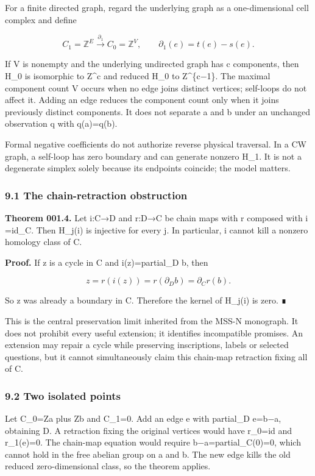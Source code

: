 \documentclass[
  11pt,
]{article}
\begin{document}
For a finite directed graph, regard the underlying graph as a
one-dimensional cell complex and define

\[
C_1=\mathbb Z^E\xrightarrow{\partial_1}C_0=\mathbb Z^V,
\qquad\partial_1(e)=t(e)-s(e).
\]

If V is nonempty and the underlying undirected graph has c components,
then H\_0 is isomorphic to Z\^{}c and reduced H\_0 to Z\^{}\{c−1\}. The
maximal component count \textbar V\textbar{} occurs when no edge joins
distinct vertices; self-loops do not affect it. Adding an edge reduces
the component count only when it joins previously distinct components.
It does not separate a and b under an unchanged observation q with
q(a)=q(b).

Formal negative coefficients do not authorize reverse physical
traversal. In a CW graph, a self-loop has zero boundary and can generate
nonzero H\_1. It is not a degenerate simplex solely because its
endpoints coincide; the model matters.

\subsubsection{9.1 The chain-retraction
obstruction}\label{the-chain-retraction-obstruction}

\textbf{Theorem 001.4.} Let i:C→D and r:D→C be chain maps with r
composed with i =id\_C. Then H\_j(i) is injective for every j. In
particular, i cannot kill a nonzero homology class of C.

\textbf{Proof.} If z is a cycle in C and i(z)=partial\_D b, then

\[
z=r(i(z))=r(\partial_D b)=\partial_C r(b).
\]

So z was already a boundary in C. Therefore the kernel of H\_j(i) is
zero. ∎

This is the central preservation limit inherited from the MSS-N
monograph. It does not prohibit every useful extension; it identifies
incompatible promises. An extension may repair a cycle while preserving
inscriptions, labels or selected questions, but it cannot simultaneously
claim this chain-map retraction fixing all of C.

\subsubsection{9.2 Two isolated points}\label{two-isolated-points}

Let C\_0=Za plus Zb and C\_1=0. Add an edge e with partial\_D e=b−a,
obtaining D. A retraction fixing the original vertices would have
r\_0=id and r\_1(e)=0. The chain-map equation would require
b−a=partial\_C(0)=0, which cannot hold in the free abelian group on a
and b. The new edge kills the old reduced zero-dimensional class, so the
theorem applies.
\end{document}
